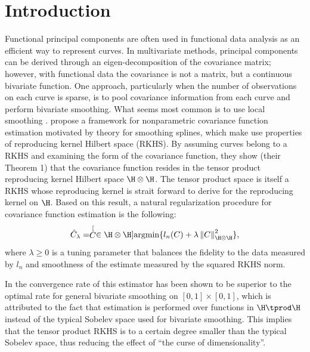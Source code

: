 \section{Introduction}
Functional principal components are often used in functional data analysis as an efficient way to represent curves. In multivariate methods, principal components can be derived through an eigen-decomposition of the covariance matrix; however, with functional data the covariance is not a matrix, but a continuous bivariate function. One approach, particularly when the number of observations on each curve is sparse, is to pool covariance information from each curve and perform bivariate smoothing. What seems most common is to use local smoothing \cite{Yao:2005cv}. \cite{Cai:2010vr} propose a framework for nonparametric covariance function estimation motivated by theory for smoothing splines, which make use properties of reproducing kernel Hilbert space (RKHS). By assuming curves belong to a RKHS and examining the form of the covariance function, they show (their Theorem 1) that the covariance function resides in the tensor product reproducing kernel Hilbert space $\H\otimes \H$. The tensor product space is itself a RKHS whose reproducing kernel is strait forward to derive for the reproducing kernel on $\H$. Based on this result, a natural regularization procedure for covariance function estimation is the following:
\begin{equation} \label{eq:cy-cov-est}
\hat{C}_{\lambda} = \stackrel[C \in \H\otimes\H]{}{\mbox{argmin}} \{l_{n}(C)+\lambda\left\Vert C\right\Vert _{\H\otimes \H}^{2}\},
\end{equation}
 where
$\lambda\geq0$ is a tuning parameter that balances the fidelity
to the data measured by $l_{n}$ and smoothness of the estimate measured
by the squared RKHS norm.

In \cite{Cai:2010vr} the convergence rate of this estimator has been shown to be superior to the optimal rate for general bivariate smoothing on $[0,1]\times[0,1]$, which is attributed to the fact that estimation is performed over functions in $\H \tprod \H$ instead of the typical Sobelev space used for bivariate smoothing. This implies that the tensor product RKHS is to a certain degree smaller than the typical Sobelev space, thus reducing the effect of ``the curse of dimensionality''. 

